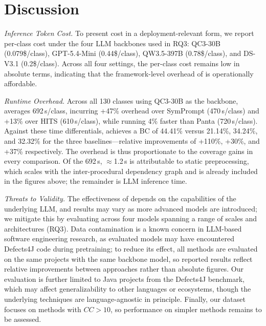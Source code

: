 \section{Discussion}


{\em Inference Token Cost.}
To present cost in a deployment-relevant form, we report per-class cost under the four LLM backbones used in RQ3: QC3-30B (0.079\$/class), GPT-5.4-Mini (0.44\$/class), QW3.5-397B (0.78\$/class), and DS-V3.1 (0.2\$/class). 
Across all four settings, the per-class cost remains low in absolute terms, indicating that the framework-level overhead of \ourmethod{} is operationally affordable. 

{\em Runtime Overhead.}
Across all 130 classes using QC3-30B as the backbone, \ourmethod{} averages 692\,s/class, incurring +47\% overhead over SymPrompt (470\,s/class) and +13\% over HITS (610\,s/class), while running 4\% faster than Panta (720\,s/class). 
Against these time differentials, \ourmethod{} achieves a BC of 44.41\% versus 21.14\%, 34.24\%, and 32.32\% for the three baselines---relative improvements of +110\%, +30\%, and +37\% respectively. The overhead is thus proportionate to the coverage gains in every comparison.
Of the 692\,s, $\approx$1.2\,s is attributable to static preprocessing, which scales with the inter-procedural dependency graph and is already included in the figures above; the remainder is LLM inference time. 

{\em Threats to Validity.}
The effectiveness of \ourmethod{} depends on the capabilities of the underlying LLM, and results may vary as more advanced models are introduced; we mitigate this by evaluating across four models spanning a range of scales and architectures (RQ3). 
Data contamination is a known concern in LLM-based software engineering research, as evaluated models may have encountered Defects4J code during pretraining; to reduce its effect, all methods are evaluated on the same projects with the same backbone model, so reported results reflect relative improvements between approaches rather than absolute figures. 
Our evaluation is further limited to Java projects from the Defects4J benchmark, which may affect generalizability to other languages or ecosystems, though the underlying techniques are language-agnostic in principle. 
Finally, our dataset focuses on methods with $CC > 10$, so performance on simpler methods remains to be assessed.
